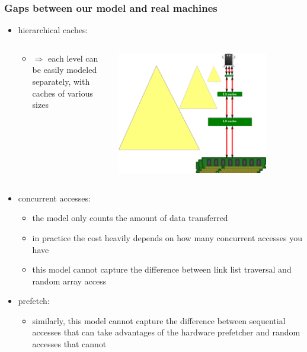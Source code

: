 \documentclass[12pt,dvipdfmx]{beamer}
\newcommand{\ao}[1]{{\color{blue}#1}}
\begin{document}
\begin{frame}
\frametitle{Gaps between our model and real machines}
\begin{itemize}
\item<1-> \ao{hierarchical caches:}
\begin{columns}
  \begin{column}{0.6\textwidth}
    \begin{itemize}
    \item []
      $\Rightarrow$ each level can be easily modeled separately, with
      caches of various sizes
    \end{itemize}
  \end{column}
  \begin{column}{0.35\textwidth}
    \includegraphics[width=0.8\textwidth]{out/pdf/svg/analysis_motivation_2.pdf}
  \end{column}
\end{columns}

\item<2-> \ao{concurrent accesses:}
  \begin{itemize}
  \item the model only counts the amount of data transferred
  \item in practice the cost heavily depends on how
    many concurrent accesses you have
  \item this model cannot capture the difference
    between link list traversal and random 
    array access
  \end{itemize}

\item<3-> \ao{prefetch:}
  \begin{itemize}
  \item similarly, this model 
    cannot capture the difference
    between sequential accesses that can take advantages of
    the hardware prefetcher and random accesses that cannot
  \end{itemize}
\end{itemize}
\end{frame}
\end{document}

